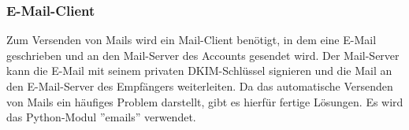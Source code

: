 \subsubsection{E-Mail-Client}
Zum Versenden von Mails wird ein Mail-Client benötigt, in dem eine E-Mail geschrieben und an den Mail-Server des Accounts gesendet wird. Der Mail-Server kann die E-Mail mit seinem privaten DKIM-Schlüssel signieren und die Mail an den E-Mail-Server des Empfängers weiterleiten. Da das automatische Versenden von Mails ein häufiges Problem darstellt, gibt es hierfür fertige Lösungen. Es wird das Python-Modul ''emails'' verwendet.

